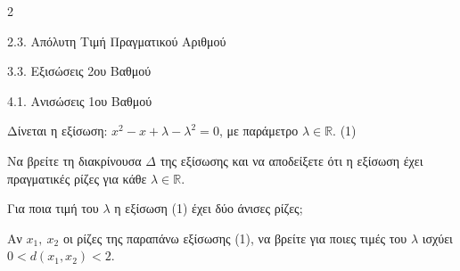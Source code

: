 \begin{ylh}{2}
    \item 2.3. Απόλυτη Τιμή Πραγματικού Αριθμού
    \item 3.3. Εξισώσεις 2ου Βαθμού
    \item 4.1. Ανισώσεις 1ου Βαθμού
\end{ylh}
Δίνεται η εξίσωση:
$x^{2} - x + \lambda - \lambda^{2} = 0$, με παράμετρο $\lambda \in \mathbb{R}$. (1)
\begin{alist}
\item Να βρείτε τη διακρίνουσα $\Delta$ της εξίσωσης και να αποδείξετε ότι η εξίσωση έχει πραγματικές ρίζες για κάθε $\lambda \in \mathbb{R}$.
\item Για ποια τιμή του $\lambda$ η εξίσωση (1) έχει δύο άνισες ρίζες;
\item Αν $x_{1},\ x_{2}$ οι ρίζες της παραπάνω εξίσωσης (1), να βρείτε για ποιες τιμές του $\lambda$ ισχύει \(
0 < d\left( x_{1},x_{2} \right) < 2\).
\end{alist}

